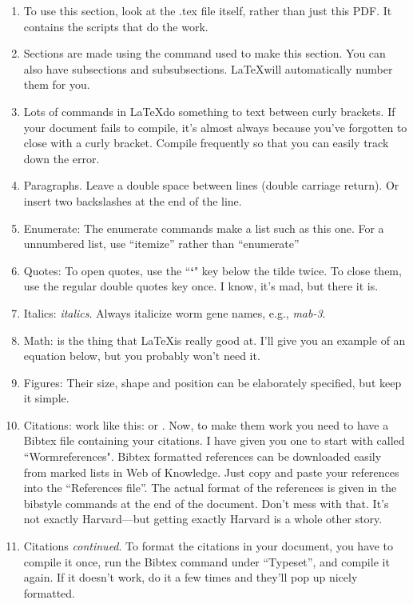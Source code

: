\documentclass[onecolumn]{article}
\begin{document}
\begin{enumerate}
\item To use this section, look at the .tex file itself, rather than just this PDF. It contains the scripts that do the work.
\item Sections are made using the command used to make this section. You can also have subsections and subsubsections. \LaTeX will automatically number them for you. 
\item Lots of commands in \LaTeX do something to text between curly brackets. If your document fails to compile, it's almost always because you've forgotten to close with a curly bracket. Compile frequently so that you can easily track down the error.
\item Paragraphs. Leave a double space between lines (double carriage return). Or insert two backslashes at the end of the line.
\item Enumerate: The enumerate commands make a list such as this one. For a unnumbered list, use ``itemize'' rather than ``enumerate''
\item Quotes: To open quotes, use the ``\textbf{`}" key below the tilde twice. To close them, use the regular double quotes key once. I know, it's mad, but there it is.
\item Italics: \emph{italics}. Always italicize worm gene names, e.g., \emph{mab-3}.
\item Math: is the thing that \LaTeX is really good at. I'll give you an example of an equation below, but you probably won't need it.
\item Figures: Their size, shape and position can be elaborately specified, but keep it simple.
\item Citations: work like this: \cite{Lee2008} or \citep{Levin2012}. Now, to make them work you need to have a Bibtex file containing your citations. I have given you one to start with called ``Wormreferences". Bibtex formatted references can be downloaded easily from marked lists in Web of Knowledge. Just copy and paste your references into the ``References file''. The actual format of the references is given in the bibstyle commands at the end of the document. Don't mess with that. It's not exactly Harvard---but getting exactly Harvard is a whole other story.
\item Citations \emph{continued}. To format the citations in your document, you have to compile it once, run the Bibtex command under ``Typeset'', and compile it again. If it doesn't work, do it a few times and they'll pop up nicely formatted.

\end{enumerate}
\end{document}
